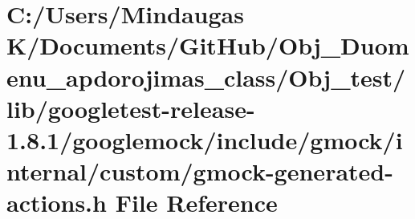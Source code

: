 \hypertarget{_obj__test_2lib_2googletest-release-1_88_81_2googlemock_2include_2gmock_2internal_2custom_2gmock-generated-actions_8h}{}\section{C\+:/\+Users/\+Mindaugas K/\+Documents/\+Git\+Hub/\+Obj\+\_\+\+Duomenu\+\_\+apdorojimas\+\_\+class/\+Obj\+\_\+test/lib/googletest-\/release-\/1.8.1/googlemock/include/gmock/internal/custom/gmock-\/generated-\/actions.h File Reference}
\label{_obj__test_2lib_2googletest-release-1_88_81_2googlemock_2include_2gmock_2internal_2custom_2gmock-generated-actions_8h}
